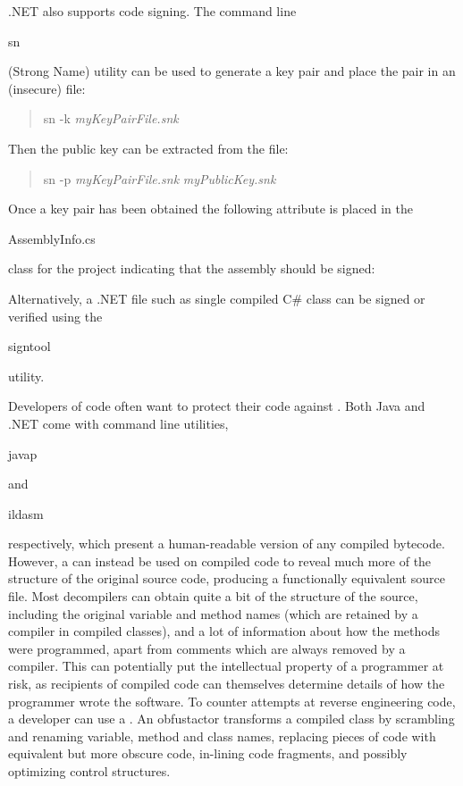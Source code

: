 .NET also supports code signing. The command line \begin{code}sn\end{code}
(Strong Name) utility can be used to generate a key pair and place the pair
in an (insecure) file:
\begin{quote}\begin{code}
sn -k \emph{myKeyPairFile.snk}
\end{code}\end{quote}
Then the public key can be extracted from the file:
\begin{quote}\begin{code}
sn -p \emph{myKeyPairFile.snk} \emph{myPublicKey.snk}
\end{code}\end{quote}
Once a key pair has been obtained the following attribute is placed in the
\begin{code}AssemblyInfo.cs\end{code} class for the project indicating that the assembly
should be signed:
\begin{quote}\begin{code}
\end{code}\end{quote}
Alternatively, a .NET file such as single compiled C\# class can be signed or verified using the
\begin{code}signtool\end{code} utility.

Developers of code often want to protect their code against .
Both Java and .NET come with command line  utilities,
\begin{code}javap\end{code} and \begin{code}ildasm\end{code} respectively,
which present a human-readable version of any compiled bytecode.
However, a  can instead be used on compiled code to reveal
much more of the structure of the original source code,
producing a functionally equivalent source file.
Most decompilers can obtain quite a bit of the structure of the source,
including the original variable and method names
(which are retained by a compiler in compiled classes),
and a lot of information about how the methods were programmed,
apart from comments which are always removed by a compiler.
This can potentially put the intellectual property of a programmer at risk,
as recipients of compiled code can themselves determine details of
how the programmer wrote the software.
To counter attempts at reverse engineering code, a developer can use a
. An obfustactor transforms a compiled class by scrambling and
renaming variable, method and class names, replacing pieces of code with equivalent but
more obscure code, in-lining code fragments, and possibly optimizing control structures.

